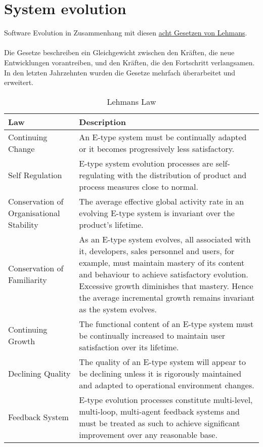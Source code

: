 \chapter{System evolution}

Software Evolution in Zusammenhang mit diesen \href{https://en.wikipedia.org/wiki/Lehman%27s_laws_of_software_evolution}{acht Gesetzen von Lehmans}. \\ \\

Die Gesetze beschreiben ein Gleichgewicht zwischen den Kräften, die neue Entwicklungen vorantreiben, und den Kräften, die den Fortschritt verlangsamen. In den letzten Jahrzehnten wurden die Gesetze mehrfach überarbeitet und erweitert.

\begin{table}[H]
 \caption{Lehmans Law}
 \begin{tabularx}{\textwidth}{|l|X|}
     \hline
     \textbf{Law}                               & \textbf{Description} \\
     \hline
     Continuing Change                          & An E-type system must be continually adapted or it becomes progressively less satisfactory. \\
     \hline
     Self Regulation                            & E-type system evolution processes are self-regulating with the distribution of product and process measures close to normal. \\
     \hline
     Conservation of Organisational Stability   & The average effective global activity rate in an evolving E-type system is invariant over the product's lifetime. \\
     \hline
     Conservation of Familiarity                & As an E-type system evolves, all associated with it, developers, sales personnel and users, for example, must maintain mastery of its content and behaviour to achieve satisfactory evolution. Excessive growth diminishes that mastery. Hence the average incremental growth remains invariant as the system evolves. \\
     \hline
     Continuing Growth                          & The functional content of an E-type system must be continually increased to maintain user satisfaction over its lifetime. \\
     \hline
     Declining Quality                          & The quality of an E-type system will appear to be declining unless it is rigorously maintained and adapted to operational environment changes. \\
     \hline
     Feedback System                            & E-type evolution processes constitute multi-level, multi-loop, multi-agent feedback systems and must be treated as such to achieve significant improvement over any reasonable base. \\
     \hline
 \end{tabularx}
 \label{table: Lehmans Law}
\end{table}

